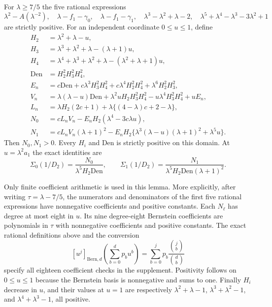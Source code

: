 \begin{lemma}[Coefficient inequalities for the kernel at $x=1/(\lambda+1)$]\label{lem:mh-high-arithmetic}
For $\lambda\ge7/5$ the five rational expressions
\[
 \lambda^2-A(\lambda^{-2}),\quad
 \lambda-f_1-\gamma_0,\quad\lambda-f_1-\gamma_1,\quad
 \lambda^3-\lambda^2+\lambda-2,\quad
 \lambda^5+\lambda^4-\lambda^3-3\lambda^2+1
\]
are strictly positive. For an independent coordinate $0\le u\le1$, define
\begin{align*}
 H_2&=\lambda^2+\lambda-u,\\
 H_3&=\lambda^3+\lambda^2+\lambda-(\lambda+1)u,\\
 H_4&=\lambda^4+\lambda^3+\lambda^2+\lambda-(\lambda^2+\lambda+1)u,\\
 \mathrm{Den}&=H_2^2H_3^2H_4^2,\\
 E_n&=c\mathrm{Den}+c\lambda^3H_3^2H_4^2
             +c\lambda^4H_2^2H_4^2+\lambda^6H_2^2H_3^2,\\
 V_n&=\lambda(\lambda-u)\mathrm{Den}
       +\lambda^2uH_2H_3^2H_4^2-u\lambda^4H_3^2H_4^2+uE_n,\\
 L_n&=\lambda H_2(2c+1)+\lambda\{(4-\lambda)c+2-\lambda\},\\
 N_0&=cL_nV_n-E_nH_2(\lambda^4-3c\lambda u),\\
 N_1&=cL_nV_n(\lambda+1)^2
       -E_nH_2\{\lambda^3(\lambda-u)(\lambda+1)^2+\lambda^5u\}.
\end{align*}
Then $N_0,N_1>0$. Every $H_i$ and $\mathrm{Den}$ is strictly positive on this domain. At $u=\lambda^2a_1$ the exact identities are
\[
 \Sigma_0(1/D_2)=\frac{N_0}{\lambda^5H_2\mathrm{Den}},\qquad
 \Sigma_1(1/D_2)=\frac{N_1}{\lambda^5H_2\mathrm{Den}(\lambda+1)^2}.
\]
\end{lemma}

Only finite coefficient arithmetic is used in this lemma. More explicitly, after writing $\tau=\lambda-7/5$, the numerators and denominators of the first five rational expressions have nonnegative coefficients and positive constants. Each $N_\ell$ has degree at most eight in $u$. Its nine degree-eight Bernstein coefficients are polynomials in $\tau$ with nonnegative coefficients and positive constants. The exact rational definitions above and the conversion
\begin{equation}\label{eq:mh-bernstein}
 [u^j]_{\mathrm{Bern},d}\left(\sum_{b=0}^dp_bu^b\right)
 =\sum_{b=0}^j p_b\frac{\binom jb}{\binom db}
\end{equation}
specify all eighteen coefficient checks in the supplement. Positivity follows on $0\le u\le1$ because the Bernstein basis is nonnegative and sums to one. Finally $H_i$ decrease in $u$, and their values at $u=1$ are respectively $\lambda^2+\lambda-1$, $\lambda^3+\lambda^2-1$, and $\lambda^4+\lambda^3-1$, all positive.


